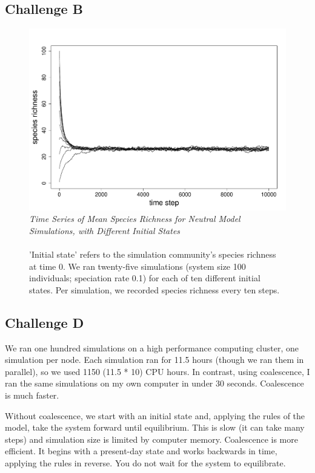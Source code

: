 \documentclass[11pt]{article}
\begin{document}
\subsection*{Challenge B}
\begin{figure}[h]
\centering
\includegraphics[width=0.8\linewidth]{../Results/Challenge_B.pdf}
\caption{\emph{Time Series of Mean Species Richness for Neutral Model Simulations, with Different Initial States}\\\\
'Initial state' refers to the simulation community's species richness at time 0. We ran twenty-five simulations (system size 100 individuals; speciation rate 0.1) for each of ten different initial states. Per simulation, we recorded species richness every ten steps.}
\end{figure}

\subsection*{Challenge D}

We ran one hundred simulations on a high performance computing cluster, one simulation per node. Each simulation ran for 11.5 hours (though we ran them in parallel), so we used 1150 (11.5 * 10) CPU hours. In contrast, using coalescence, I ran the same simulations on my own computer in under 30 seconds. Coalescence is much faster.

Without coalescence, we start with an initial state and, applying the rules of the model, take the system forward until equilibrium. This is slow (it can take many steps) and simulation size is limited by computer memory. Coalescence is more efficient. It begins with a present-day state and works backwards in time, applying the rules in reverse. You do not wait for the system to equilibrate.
\end{document}
